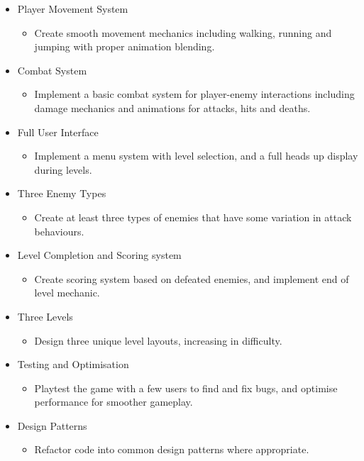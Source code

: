 \documentclass[]{final_report}
\begin{document}
\begin{itemize}
    \item Player Movement System
    \begin{itemize}
	\item{Create smooth movement mechanics including walking, running and jumping with proper animation blending.}
    \end{itemize}
    \item Combat System
    \begin{itemize}
	\item{Implement a basic combat system for player-enemy interactions including damage mechanics and animations for attacks, hits and deaths.}
    \end{itemize}
    \item Full User Interface
    \begin{itemize}
	\item{Implement a menu system with level selection, and a full heads up display during levels.}
    \end{itemize}
    \item Three Enemy Types
    \begin{itemize}
	\item{Create at least three types of enemies that have some variation in attack behaviours.}
    \end{itemize}
    \item Level Completion and Scoring system
    \begin{itemize}
	\item{Create scoring system based on defeated enemies, and implement end of level mechanic.}
    \end{itemize}
    \item Three Levels
    \begin{itemize}
	\item{Design three unique level layouts, increasing in difficulty.}
    \end{itemize}
    \item Testing and Optimisation
    \begin{itemize}
	\item{Playtest the game with a few users to find and fix bugs, and optimise performance for smoother gameplay.}
    \end{itemize}
    \item Design Patterns
    \begin{itemize}
	\item{Refactor code into common design patterns where appropriate.}
    \end{itemize}
\end{itemize}
\end{document}
